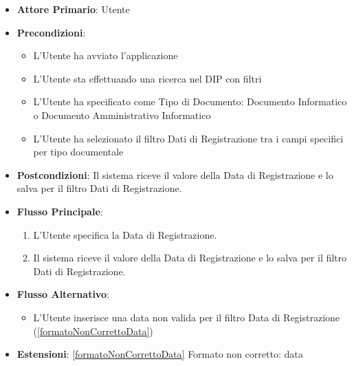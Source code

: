 \begin{itemize}
      \item \textbf{Attore Primario}: Utente
      \item \textbf{Precondizioni}: 
      \begin{itemize}            
            \item L'Utente ha avviato l'applicazione
            \item L'Utente sta effettuando una ricerca nel DIP con filtri
            \item L'Utente ha specificato come Tipo di Documento: Documento Informatico o Documento Amministrativo Informatico
            \item L'Utente ha selezionato il filtro Dati di Registrazione tra i campi specifici per tipo documentale
      \end{itemize}
      \item \textbf{Postcondizioni}: Il sistema riceve il valore della Data di Registrazione e lo salva per il filtro Dati di Registrazione.
      \item \textbf{Flusso Principale}:
      \begin{enumerate}
            \item L'Utente specifica la Data di Registrazione.
            \item Il sistema riceve il valore della Data di Registrazione e lo salva per il filtro Dati di Registrazione.
      \end{enumerate}
      \item \textbf{Flusso Alternativo}:
      \begin{itemize}
            \item L'Utente inserisce una data non valida per il filtro Data di Registrazione (\ref{formatoNonCorrettoData})
      \end{itemize}
      \item \textbf{Estensioni}: \ref{formatoNonCorrettoData} Formato non corretto: data
\end{itemize}

